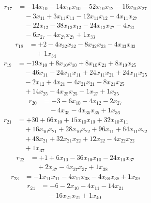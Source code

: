 \[\begin{aligned}
r_{17} &= - 14 x_{10} - 14 x_{10} x_{10} - 52 x_{10} x_{12} - 16 x_{10} x_{27} \\
 &\quad - 3 x_{11} + 3 x_{11} x_{11} - 12 x_{11} x_{12} - 4 x_{11} x_{27} \\
 &\quad - 22 x_{12} - 38 x_{12} x_{12} - 24 x_{12} x_{27} - 4 x_{21} \\
 &\quad - 6 x_{27} - 4 x_{27} x_{27} + 1 x_{33}
\end{aligned}\]
\[\begin{aligned}
r_{18} &= + 2 - 4 x_{32} x_{32} - 8 x_{32} x_{33} - 4 x_{33} x_{33} \\
 &\quad + 1 x_{34}
\end{aligned}\]
\[\begin{aligned}
r_{19} &= - 19 x_{10} + 8 x_{10} x_{10} + 8 x_{10} x_{21} + 8 x_{10} x_{25} \\
 &\quad - 46 x_{11} - 24 x_{11} x_{11} + 24 x_{11} x_{21} + 24 x_{11} x_{25} \\
 &\quad - 2 x_{12} + 4 x_{21} - 4 x_{21} x_{21} - 8 x_{21} x_{25} \\
 &\quad + 14 x_{25} - 4 x_{25} x_{25} - 1 x_{27} + 1 x_{35}
\end{aligned}\]
\[\begin{aligned}
r_{20} &= - 3 - 6 x_{10} - 4 x_{12} - 2 x_{27} \\
 &\quad - 4 x_{35} - 4 x_{35} x_{35} + 1 x_{36}
\end{aligned}\]
\[\begin{aligned}
r_{21} &= + 30 + 66 x_{10} + 15 x_{10} x_{10} + 32 x_{10} x_{11} \\
 &\quad + 16 x_{10} x_{21} + 28 x_{10} x_{22} + 96 x_{11} + 64 x_{11} x_{22} \\
 &\quad + 48 x_{21} + 32 x_{21} x_{22} + 12 x_{22} - 4 x_{22} x_{22} \\
 &\quad + 1 x_{37}
\end{aligned}\]
\[\begin{aligned}
r_{22} &= + 1 + 6 x_{10} - 36 x_{10} x_{10} - 24 x_{10} x_{37} \\
 &\quad + 2 x_{37} - 4 x_{37} x_{37} + 1 x_{38}
\end{aligned}\]
\[\begin{aligned}
r_{23} &= - 1 x_{11} x_{11} - 4 x_{11} x_{38} - 4 x_{38} x_{38} + 1 x_{39}
\end{aligned}\]
\[\begin{aligned}
r_{24} &= - 6 - 2 x_{10} - 4 x_{11} - 14 x_{21} \\
 &\quad - 16 x_{21} x_{21} + 1 x_{40}
\end{aligned}\]
